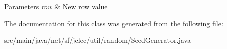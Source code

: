 \begin{DoxyParams}{Parameters}
{\em row} & New row value \\
\hline
\end{DoxyParams}


The documentation for this class was generated from the following file\-:\begin{DoxyCompactItemize}
\item 
src/main/java/net/sf/jclec/util/random/Seed\-Generator.\-java\end{DoxyCompactItemize}
